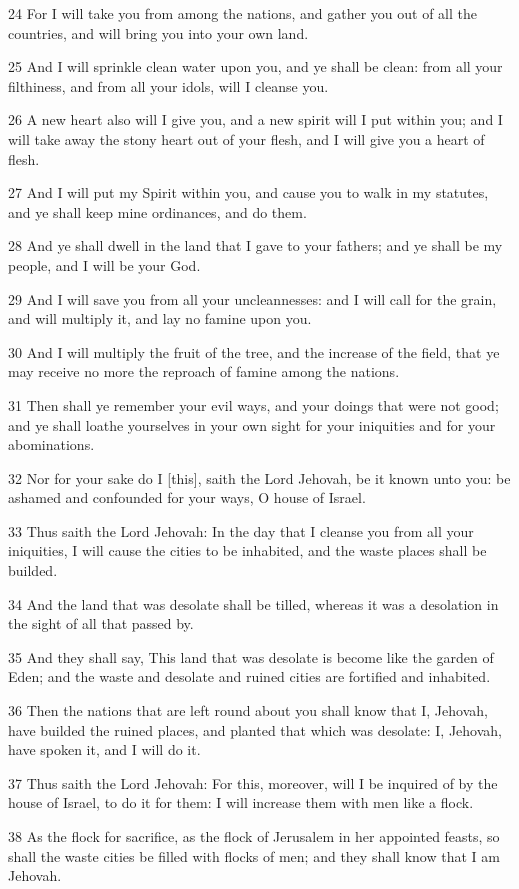 \par 24 For I will take you from among the nations, and gather you out of all the countries, and will bring you into your own land.
\par 25 And I will sprinkle clean water upon you, and ye shall be clean: from all your filthiness, and from all your idols, will I cleanse you.
\par 26 A new heart also will I give you, and a new spirit will I put within you; and I will take away the stony heart out of your flesh, and I will give you a heart of flesh.
\par 27 And I will put my Spirit within you, and cause you to walk in my statutes, and ye shall keep mine ordinances, and do them.
\par 28 And ye shall dwell in the land that I gave to your fathers; and ye shall be my people, and I will be your God.
\par 29 And I will save you from all your uncleannesses: and I will call for the grain, and will multiply it, and lay no famine upon you.
\par 30 And I will multiply the fruit of the tree, and the increase of the field, that ye may receive no more the reproach of famine among the nations.
\par 31 Then shall ye remember your evil ways, and your doings that were not good; and ye shall loathe yourselves in your own sight for your iniquities and for your abominations.
\par 32 Nor for your sake do I [this], saith the Lord Jehovah, be it known unto you: be ashamed and confounded for your ways, O house of Israel.
\par 33 Thus saith the Lord Jehovah: In the day that I cleanse you from all your iniquities, I will cause the cities to be inhabited, and the waste places shall be builded.
\par 34 And the land that was desolate shall be tilled, whereas it was a desolation in the sight of all that passed by.
\par 35 And they shall say, This land that was desolate is become like the garden of Eden; and the waste and desolate and ruined cities are fortified and inhabited.
\par 36 Then the nations that are left round about you shall know that I, Jehovah, have builded the ruined places, and planted that which was desolate: I, Jehovah, have spoken it, and I will do it.
\par 37 Thus saith the Lord Jehovah: For this, moreover, will I be inquired of by the house of Israel, to do it for them: I will increase them with men like a flock.
\par 38 As the flock for sacrifice, as the flock of Jerusalem in her appointed feasts, so shall the waste cities be filled with flocks of men; and they shall know that I am Jehovah.

